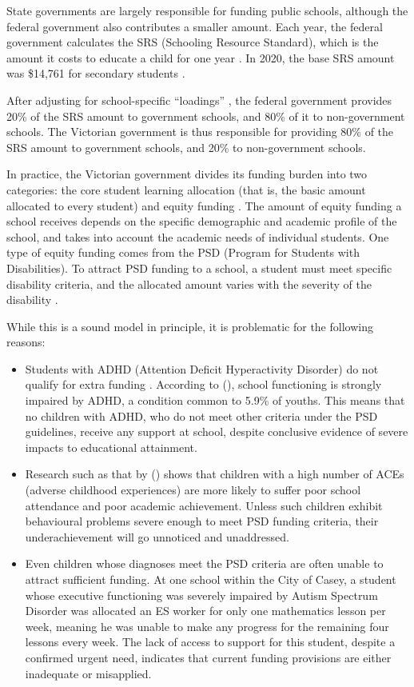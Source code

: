 \documentclass[11pt, a4paper]{article}
\begin{document}
    State governments are largely responsible for funding public schools, although the federal government also contributes a smaller amount. Each year, the federal government calculates the SRS (Schooling Resource Standard), which is the amount it costs to educate a child for one year \parencite{srs_background}. In 2020, the base SRS amount was \$14,761 for secondary students \parencite{srs_2020}.

    After adjusting for school-specific ``loadings'' \parencite{srs_2020}, the federal government provides 20\% of the SRS amount to government schools, and 80\% of it to non-government schools. The Victorian government is thus responsible for providing 80\% of the SRS amount to government schools, and 20\% to non-government schools. 

    In practice, the Victorian government divides its funding burden into two categories: the core student learning allocation (that is, the basic amount allocated to every student) and equity funding \parencite{srp_vic}. The amount of equity funding a school receives depends on the specific demographic and academic profile of the school, and takes into account the academic needs of individual students. One type of equity funding comes from the PSD (Program for Students with Disabilities). To attract PSD funding to a school, a student must meet specific disability criteria, and the allocated amount varies with the severity of the disability \parencite{psd_guidelines}.

    While this is a sound model in principle, it is problematic for the following reasons:

    \begin{itemize}
        \item Students with ADHD (Attention Deficit Hyperactivity Disorder) do not qualify for extra funding \parencite{psd_guidelines}. According to  (), school functioning is strongly impaired by ADHD, a condition common to 5.9\% of youths. This means that no children with ADHD, who do not meet other criteria under the PSD guidelines, receive any support at school, despite conclusive evidence of severe impacts to educational attainment.
        \item Research such as that by  () shows that children with a high number of ACEs (adverse childhood experiences) are more likely to suffer poor school attendance and poor academic achievement. Unless such children exhibit behavioural problems severe enough to meet PSD funding criteria, their underachievement will go unnoticed and unaddressed.
        \item Even children whose diagnoses meet the PSD criteria are often unable to attract sufficient funding. At one school within the City of Casey, a student whose executive functioning was severely impaired by Autism Spectrum Disorder was allocated an ES worker for only one mathematics lesson per week, meaning he was unable to make any progress for the remaining four lessons every week. The lack of access to support for this student, despite a confirmed urgent need, indicates that current funding provisions are either inadequate or misapplied.
    \end{itemize}
\end{document}
